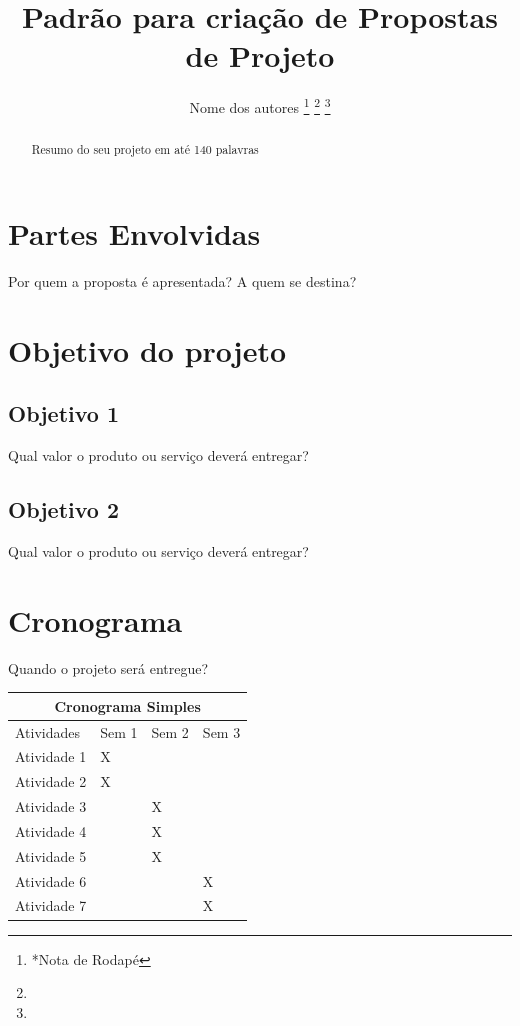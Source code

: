 \documentclass[letterpaper, 10 pt, conference]{ieeeconf}  %
\title{\LARGE \bf
Padrão para criação de Propostas de Projeto
}
\author{Nome dos autores%
\thanks{*Nota de Rodapé}%
\thanks{
        {\tt\small}}%
\thanks{
        {\tt\small}}%
}
\begin{document}
\maketitle
\thispagestyle{empty}
\pagestyle{empty}


\begin{abstract}

Resumo do seu projeto em até 140 palavras

\end{abstract}


\section{Partes Envolvidas}

Por quem a proposta é apresentada? A quem se destina?


\section{Objetivo do projeto}

\subsection{Objetivo 1}

Qual valor o produto ou serviço deverá entregar?


\subsection{Objetivo 2 }

Qual valor o produto ou serviço deverá entregar?

\section{Cronograma}

Quando o projeto será entregue?

\begin{tabular}{ |p{3cm}||p{1cm}|p{1cm}|p{1cm}|  }
 \hline
 \multicolumn{4}{|c|}{Cronograma Simples} \\
 \hline
 Atividades & Sem 1 &Sem 2&Sem 3\\
 \hline
 Atividade 1 & X & & \\
  \hline
 Atividade 2 & X & & \\
  \hline
 Atividade 3 &  & X & \\
  \hline
 Atividade 4 &  & X & \\
  \hline
 Atividade 5 &  & X & \\
  \hline
 Atividade 6 &  &  & X \\
  \hline
 Atividade 7 &  &  & X \\
 \hline
\end{tabular}
\end{document}

